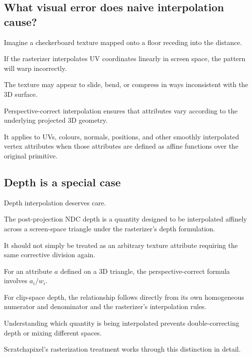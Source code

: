 \subsection{What visual error does naive interpolation cause?}\label{02-foundations-ii-ch034-what-visual-error-does-naive-interpolation-cause}

\hypertarget{02-foundations-ii-ch034-what-visual-error-does-naive-interpolation-cause}{}

Imagine a checkerboard texture mapped onto a floor receding into the distance.

If the rasterizer interpolates UV coordinates linearly in screen space, the pattern will warp incorrectly.

The texture may appear to slide, bend, or compress in ways inconsistent with the 3D surface.

Perspective-correct interpolation ensures that attributes vary according to the underlying projected 3D geometry.

It applies to UVs, colours, normals, positions, and other smoothly interpolated vertex attributes when those attributes are defined as affine functions over the original primitive.

\subsection{Depth is a special case}\label{02-foundations-ii-ch034-depth-is-a-special-case}

\hypertarget{02-foundations-ii-ch034-depth-is-a-special-case}{}

Depth interpolation deserves care.

The post-projection NDC depth is a quantity designed to be interpolated affinely across a screen-space triangle under the rasterizer's depth formulation.

It should not simply be treated as an arbitrary texture attribute requiring the same corrective division again.

For an attribute \(a\) defined on a 3D triangle, the perspective-correct formula involves \(a_i/w_i\).

For clip-space depth, the relationship follows directly from its own homogeneous numerator and denominator and the rasterizer's interpolation rules.

Understanding which quantity is being interpolated prevents double-correcting depth or mixing different spaces.

Scratchapixel's rasterization treatment works through this distinction in detail. 

